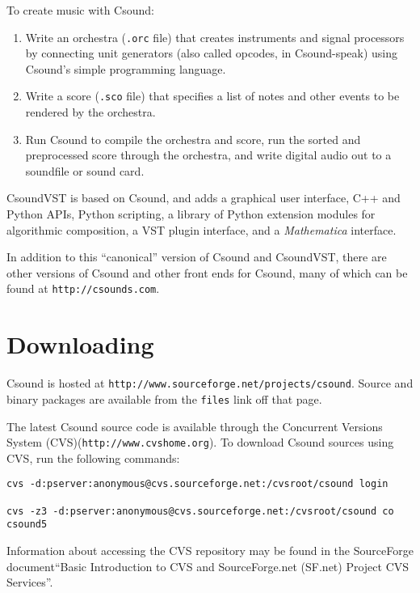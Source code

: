 \documentclass[10pt,letterpaper,onecolumn]{ltxguide}
\begin{document}
To create music with Csound:

\begin{enumerate}
\item Write an orchestra (\texttt{.orc} file) that creates instruments and signal processors by connecting unit generators (also called opcodes, in Csound-speak) using Csound's simple programming language.
\item Write a score (\texttt{.sco} file) that specifies a list of notes and other events to be rendered by the orchestra.
\item Run Csound to compile the orchestra and score, run the sorted and preprocessed score through the orchestra, and write digital audio out to a soundfile or sound card.
\end{enumerate}

CsoundVST is based on Csound, and adds a graphical user interface, C++ and Python APIs, Python scripting, a library of Python extension modules for algorithmic composition, a VST plugin interface, and a \emph{Mathematica} interface.

In addition to this ``canonical'' version of Csound and CsoundVST, there are other versions of Csound and other front ends for Csound, many of which can be found at \texttt{http://csounds.com}.

\section{Downloading}

Csound is hosted at \texttt{http:\-//www.sourceforge.net/projects/\-csound}. \linebreak Source and binary packages are available from the \texttt{files} link off that page.

The latest Csound source code is available through the Concurrent Versions System (CVS)(\texttt{http:\-//www.cvshome.org}). To download Csound sources using CVS, run the following commands:

\begin{verbatim}
cvs -d:pserver:anonymous@cvs.sourceforge.net:/cvsroot/csound login 
 
cvs -z3 -d:pserver:anonymous@cvs.sourceforge.net:/cvsroot/csound co csound5 
\end{verbatim}

Information about accessing the CVS repository may be found in the SourceForge document``Basic Introduction to CVS and SourceForge.net (SF.net) Project CVS Services''. 
\end{document}
